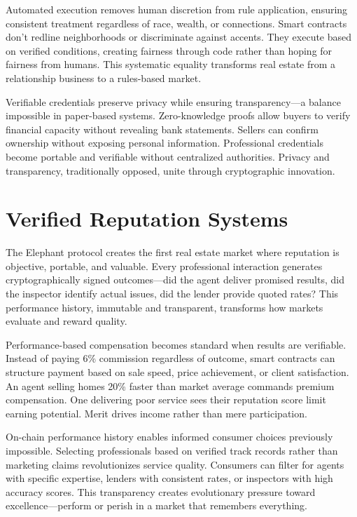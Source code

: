 Automated execution removes human discretion from rule application, ensuring consistent treatment regardless of race, wealth, or connections. Smart contracts don't redline neighborhoods or discriminate against accents. They execute based on verified conditions, creating fairness through code rather than hoping for fairness from humans. This systematic equality transforms real estate from a relationship business to a rules-based market.

Verifiable credentials preserve privacy while ensuring transparency—a balance impossible in paper-based systems. Zero-knowledge proofs allow buyers to verify financial capacity without revealing bank statements. Sellers can confirm ownership without exposing personal information. Professional credentials become portable and verifiable without centralized authorities. Privacy and transparency, traditionally opposed, unite through cryptographic innovation.

\section{Verified Reputation Systems}

The Elephant protocol creates the first real estate market where reputation is objective, portable, and valuable. Every professional interaction generates cryptographically signed outcomes—did the agent deliver promised results, did the inspector identify actual issues, did the lender provide quoted rates? This performance history, immutable and transparent, transforms how markets evaluate and reward quality.

Performance-based compensation becomes standard when results are verifiable. Instead of paying 6\% commission regardless of outcome, smart contracts can structure payment based on sale speed, price achievement, or client satisfaction. An agent selling homes 20\% faster than market average commands premium compensation. One delivering poor service sees their reputation score limit earning potential. Merit drives income rather than mere participation.

On-chain performance history enables informed consumer choices previously impossible. Selecting professionals based on verified track records rather than marketing claims revolutionizes service quality. Consumers can filter for agents with specific expertise, lenders with consistent rates, or inspectors with high accuracy scores. This transparency creates evolutionary pressure toward excellence—perform or perish in a market that remembers everything.

